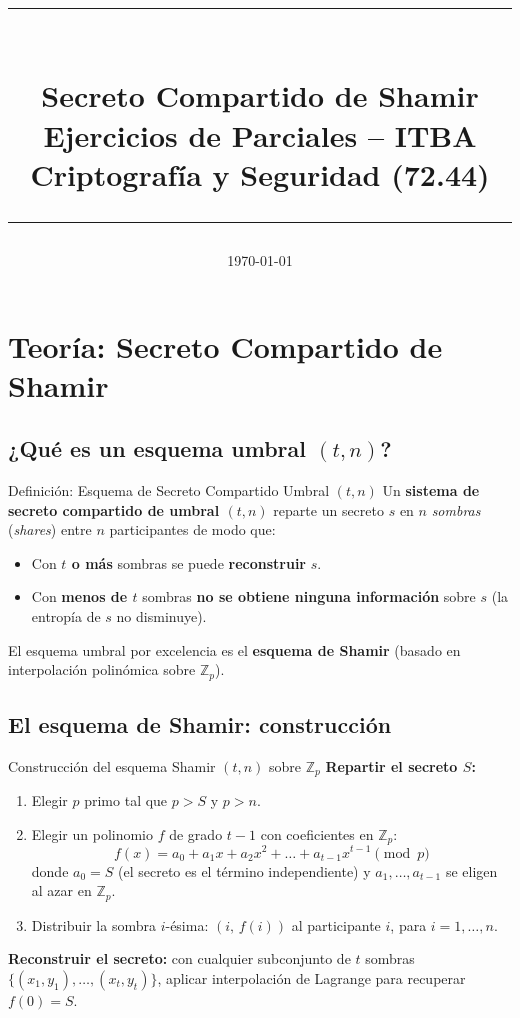\documentclass[11pt,a4paper]{article}
\title{
  \vspace{-1cm}
  {\color{itbaBlue}\rule{\linewidth}{2pt}}\\[0.3cm]
  {\Huge\bfseries\color{itbaBlue} Secreto Compartido de Shamir}\\[0.2cm]
  {\large\color{itbaCyan} Ejercicios de Parciales -- ITBA Criptografía y Seguridad (72.44)}\\[0.2cm]
  {\color{itbaBlue}\rule{\linewidth}{2pt}}
}
\author{}
\date{\today}
\begin{document}
\maketitle
\tableofcontents
\newpage

\section{Teoría: Secreto Compartido de Shamir}

\subsection{¿Qué es un esquema umbral $(t,n)$?}

\begin{teoriabox}{Definición: Esquema de Secreto Compartido Umbral $(t,n)$}
Un \textbf{sistema de secreto compartido de umbral $(t,n)$} reparte un secreto $s$ en $n$ \emph{sombras} (\emph{shares}) entre $n$ participantes de modo que:
\begin{itemize}
  \item Con \textbf{$t$ o más} sombras se puede \textbf{reconstruir} $s$.
  \item Con \textbf{menos de $t$} sombras \textbf{no se obtiene ninguna información} sobre $s$ (la entropía de $s$ no disminuye).
\end{itemize}
El esquema umbral por excelencia es el \textbf{esquema de Shamir} (basado en interpolación polinómica sobre $\mathbb{Z}_p$).
\end{teoriabox}

\subsection{El esquema de Shamir: construcción}

\begin{teoriabox}{Construcción del esquema Shamir $(t,n)$ sobre $\mathbb{Z}_p$}
\textbf{Repartir el secreto $S$:}
\begin{enumerate}
  \item Elegir $p$ primo tal que $p > S$ y $p > n$.
  \item Elegir un polinomio $f$ de grado $t-1$ con coeficientes en $\mathbb{Z}_p$:
  \[
    f(x) = a_0 + a_1 x + a_2 x^2 + \dots + a_{t-1} x^{t-1} \pmod{p}
  \]
  donde $a_0 = S$ (el secreto es el término independiente) y $a_1, \dots, a_{t-1}$ se eligen al azar en $\mathbb{Z}_p$.
  \item Distribuir la sombra $i$-ésima: $(i,\, f(i))$ al participante $i$, para $i = 1, \dots, n$.
\end{enumerate}
\textbf{Reconstruir el secreto:} con cualquier subconjunto de $t$ sombras $\{(x_1,y_1), \dots, (x_t,y_t)\}$, aplicar interpolación de Lagrange para recuperar $f(0) = S$.
\end{teoriabox}
\end{document}
